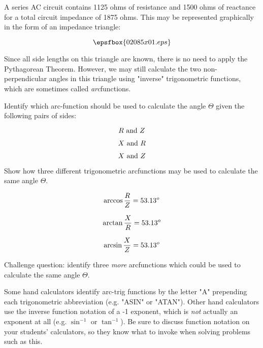 

A series AC circuit contains 1125 ohms of resistance and 1500 ohms of reactance for a total circuit impedance of 1875 ohms.  This may be represented graphically in the form of an impedance triangle:

$$\epsfbox{02085x01.eps}$$

Since all side lengths on this triangle are known, there is no need to apply the Pythagorean Theorem.  However, we may still calculate the two non-perpendicular angles in this triangle using "inverse" trigonometric functions, which are sometimes called {\it arc}functions.

\goodbreak

Identify which arc-function should be used to calculate the angle $\Theta$ given the following pairs of sides:

$$R \hbox{ and } Z$$

$$X \hbox{ and } R$$

$$X \hbox{ and } Z$$

Show how three different trigonometric arcfunctions may be used to calculate the same angle $\Theta$.







$$\arccos {R \over Z} = 53.13^o$$

$$\arctan {X \over R} = 53.13^o$$

$$\arcsin {X \over Z} = 53.13^o$$

\vskip 10pt

Challenge question: identify three {\it more} arcfunctions which could be used to calculate the same angle $\Theta$.







Some hand calculators identify arc-trig functions by the letter "A" prepending each trigonometric abbreviation (e.g. "ASIN" or "ATAN").  Other hand calculators use the inverse function notation of a -1 exponent, which is {\it not} actually an exponent at all (e.g. $\sin^{-1}$ or $\tan^{-1}$).  Be sure to discuss function notation on your students' calculators, so they know what to invoke when solving problems such as this.




